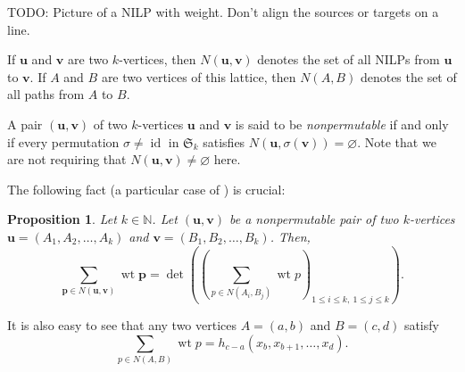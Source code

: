 \documentclass[reqno]{amsart}%
\newcommand{\0}{\phantom{c}}
\let\sumnonlimits\sum
\renewcommand{\sum}{\sumnonlimits\limits}
\newcommand{\defn}[1]{{\color{darkred}\emph{#1}}}
\theoremstyle{plain}
\newtheorem{prop}[thm]{Proposition}
\theoremstyle{definition}
\numberwithin{equation}{section}
\begin{document}
TODO: Picture of a NILP with weight. Don't align the sources or targets on a line.

If $\mathbf{u}$ and $\mathbf{v}$ are two $k$-vertices, then
\defn{$N\left( \mathbf{u},\mathbf{v}\right)  $} denotes the set of all NILPs
from $\mathbf{u}$ to $\mathbf{v}$. If $A$ and $B$ are two vertices of this
lattice, then \defn{$N\left( A, B \right)  $} denotes the set of all paths
from $A$ to $B$.

A pair $\left(  \mathbf{u},\mathbf{v}\right)  $ of two $k$-vertices
$\mathbf{u}$ and $\mathbf{v}$ is said to be \defn{nonpermutable} if and only
if every permutation $\sigma\neq\operatorname*{id}$ in $\mathfrak{S}_{k}$
satisfies $N\left(  \mathbf{u},\sigma\left(  \mathbf{v}\right)  \right)
=\varnothing$. Note that we are not requiring that $N\left(  \mathbf{u}%
,\mathbf{v}\right)  \neq\varnothing$ here.

The following fact (a particular case of \cite[Corollary 2]{GesVie89}) is crucial:

\begin{prop}
\label{prop.LGV.nonper}Let $k\in\mathbb{N}$. Let $\left(  \mathbf{u}%
,\mathbf{v}\right)  $ be a nonpermutable pair of two $k$-vertices
$\mathbf{u}=\left(  A_{1},A_{2},\ldots,A_{k}\right)  $ and $\mathbf{v}=\left(
B_{1},B_{2},\ldots,B_{k}\right)  $. Then,%
\[
\sum_{\mathbf{p}\in N\left(  \mathbf{u},\mathbf{v}\right)  }\operatorname*{wt}%
\mathbf{p}=\det\left(  \left(  \sum_{p\in N\left(  A_{i},B_{j}\right)
}\operatorname*{wt}p\right)  _{1\leq i\leq k,\ 1\leq j\leq k}\right)  .
\]

\end{prop}

It is also easy to see that any two vertices $A=\left(  a,b\right)  $ and
$B=\left(  c,d\right)  $ satisfy%
\begin{equation}
\sum_{p\in N\left(  A,B\right)  }\operatorname*{wt}p=h_{c-a}\left(
x_{b},x_{b+1},\ldots,x_{d}\right)  . \label{eq.LGV.single-paths}%
\end{equation}
\end{document}
